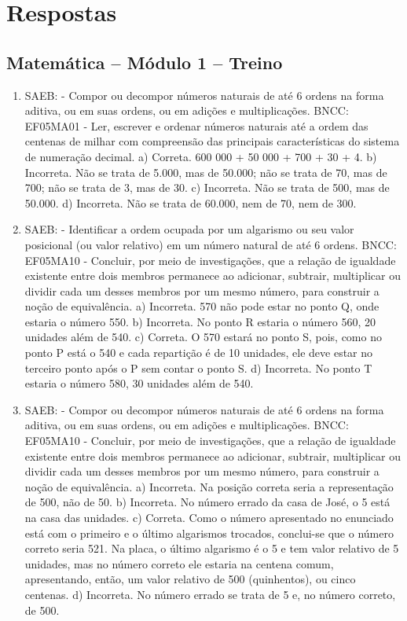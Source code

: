 \chapter{Respostas}
\pagestyle{plain}
\scriptsize

\pagecolor{gray!40}

\section*{Matemática -- Módulo 1 -- Treino}

\begin{enumerate}
\item 
SAEB: - Compor ou decompor números naturais de até 6 ordens na forma aditiva, ou em suas ordens, ou em adições e multiplicações.
BNCC: EF05MA01 - Ler, escrever e ordenar números naturais até a ordem das centenas de milhar com
compreensão das principais características do sistema de numeração decimal.
a) Correta. 600 000 + 50 000 + 700 + 30 + 4.
b) Incorreta. Não se trata de 5.000, mas de 50.000; não se trata de 70, mas de 700; não se trata de 3, mas de 30.
c) Incorreta. Não se trata de 500, mas de 50.000.
d) Incorreta. Não se trata de 60.000, nem de 70, nem de 300.

\item
SAEB: - Identificar a ordem ocupada por um algarismo ou seu valor posicional (ou valor relativo) em um número natural de até 6 ordens.
BNCC: EF05MA10 - Concluir, por meio de investigações, que a relação de igualdade existente
entre dois membros permanece ao adicionar, subtrair, multiplicar ou dividir cada um desses
membros por um mesmo número, para construir a noção de equivalência.
a) Incorreta. 570 não pode estar no ponto Q, onde estaria o número 550.
b) Incorreta. No ponto R estaria o número 560, 20 unidades além de 540.
c) Correta. O 570 estará no ponto S, pois, como no ponto P está o 540 e cada
repartição é de 10 unidades, ele deve estar no terceiro ponto após o P
sem contar o ponto S.
d) Incorreta. No ponto T estaria o número 580, 30 unidades além de 540.

\item
SAEB: - Compor ou decompor números naturais de até 6 ordens na forma aditiva, ou em suas ordens, ou em adições e multiplicações.
BNCC: EF05MA10 - Concluir, por meio de investigações, que a relação de igualdade existente
entre dois membros permanece ao adicionar, subtrair, multiplicar ou dividir cada um desses
membros por um mesmo número, para construir a noção de equivalência.
a) Incorreta. Na posição correta seria a representação de 500, não de 50.
b) Incorreta. No número errado da casa de José, o 5 está na casa das unidades.
c) Correta. Como o número apresentado no enunciado está com o primeiro e o último
algarismos trocados, conclui-se que o número correto seria 521. Na placa,
o último algarismo é o 5 e tem valor relativo de 5 unidades, mas no
número correto ele estaria na centena comum, apresentando, então, um valor
relativo de 500 (quinhentos), ou cinco centenas.
d) Incorreta. No número errado se trata de 5 e, no número correto, de 500.

\end{enumerate}

